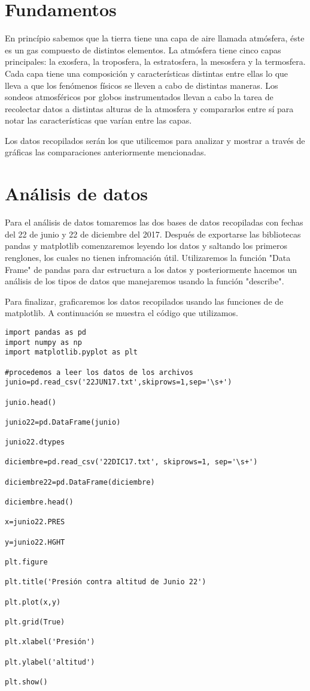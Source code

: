 \documentclass[12pt]{article}
\begin{document}
\section{Fundamentos}

En princípio sabemos que la tierra tiene una capa de aire llamada atmósfera, éste es un gas compuesto de distintos elementos. La atmósfera tiene cinco capas principales: la exosfera, la troposfera, la estratosfera, la mesosfera y la termosfera. Cada capa tiene una composición y características distintas entre ellas lo que lleva a que los fenómenos físicos se lleven a cabo de distintas maneras. Los sondeos atmosféricos por globos instrumentados llevan a cabo la tarea de recolectar datos a distintas alturas de la atmosfera y compararlos entre sí para notar las características que varían entre las capas.

Los datos recopilados serán los que utilicemos para analizar y mostrar a través de gráficas las comparaciones anteriormente mencionadas.

\section{Análisis de datos} 

Para el análisis de datos tomaremos las dos bases de datos recopiladas con fechas del 22 de junio y 22 de diciembre del 2017. Después de exportarse las bibliotecas pandas y matplotlib comenzaremos leyendo los datos y saltando los primeros renglones, los cuales no tienen infromación útil. Utilizaremos la función "Data Frame" de pandas para dar estructura a los datos y posteriormente hacemos un análisis de los tipos de datos que manejaremos usando la función "describe".

Para finalizar, graficaremos los datos recopilados usando las funciones de de matplotlib. A continuación se muestra el código que utilizamos.

\begin{verbatim}
import pandas as pd
import numpy as np
import matplotlib.pyplot as plt

#procedemos a leer los datos de los archivos
junio=pd.read_csv('22JUN17.txt',skiprows=1,sep='\s+')

junio.head()

junio22=pd.DataFrame(junio)

junio22.dtypes

diciembre=pd.read_csv('22DIC17.txt', skiprows=1, sep='\s+')

diciembre22=pd.DataFrame(diciembre)

diciembre.head()

x=junio22.PRES

y=junio22.HGHT

plt.figure

plt.title('Presión contra altitud de Junio 22')

plt.plot(x,y)

plt.grid(True)

plt.xlabel('Presión')

plt.ylabel('altitud')

plt.show()


\end{verbatim}
\end{document}
